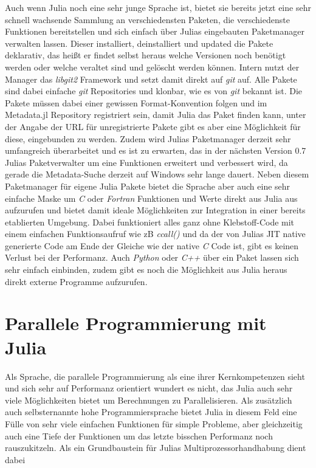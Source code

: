 \documentclass[proseminar,german,utf8]{zihpub}
\begin{document}
Auch wenn Julia noch eine sehr junge Sprache ist, bietet sie bereits jetzt eine sehr schnell wachsende Sammlung an verschiedensten Paketen, die verschiedenste Funktionen bereitstellen und sich einfach über Julias eingebauten Paketmanager verwalten lassen. Dieser installiert, deinstalliert und updated die Pakete deklarativ, das heißt er findet selbst heraus welche Versionen noch benötigt werden oder welche veraltet sind und gelöscht werden können. Intern nutzt der Manager das \textit{libgit2} Framework und setzt damit direkt auf \textit{git} auf. Alle Pakete sind dabei einfache \textit{git} Repositories und klonbar, wie es von \textit{git} bekannt ist. Die Pakete müssen dabei einer gewissen Format-Konvention folgen und im Metadata.jl Repository registriert sein, damit Julia das Paket finden kann, unter der Angabe der URL für unregistrierte Pakete gibt es aber eine Möglichkeit für diese, eingebunden zu werden. Zudem wird Julias Paketmanager derzeit sehr umfangreich überarbeitet und es ist zu erwarten, das in der nächsten Version 0.7 Julias Paketverwalter um eine Funktionen erweitert und verbessert wird, da gerade die Metadata-Suche derzeit auf Windows sehr lange dauert. Neben diesem Paketmanager für eigene Julia Pakete bietet die Sprache aber auch eine sehr einfache Maske um \textit{C} oder \textit{Fortran} Funktionen und Werte direkt aus Julia aus aufzurufen und bietet damit ideale Möglichkeiten zur Integration in einer bereits etablierten Umgebung. Dabei funktioniert alles ganz ohne Klebstoff-Code mit einem einfachen Funktionsaufruf wie zB \textit{ccall()} und da der von Julias JIT native generierte Code am Ende der Gleiche wie der native \textit{C} Code ist, gibt es keinen Verlust bei der Performanz. Auch \textit{Python} oder \textit{C++} über ein Paket lassen sich sehr einfach einbinden, zudem gibt es noch die Möglichkeit aus Julia heraus direkt externe Programme aufzurufen.

\section{Parallele Programmierung mit Julia}

Als Sprache, die parallele Programmierung als eine ihrer Kernkompetenzen sieht und sich sehr auf Performanz orientiert wundert es nicht, das Julia auch sehr viele Möglichkeiten bietet um Berechnungen zu Parallelisieren. Als zusätzlich auch selbsternannte hohe Programmiersprache bietet Julia in diesem Feld eine Fülle von sehr viele einfachen Funktionen für simple Probleme, aber gleichzeitig auch eine Tiefe der Funktionen um das letzte bisschen Performanz noch rauszukitzeln. Als ein Grundbaustein für Julias Multiprozessorhandhabung dient dabei  
\end{document}

